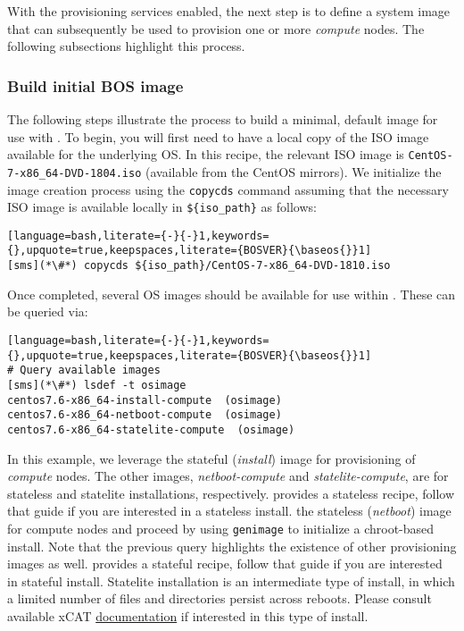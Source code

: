 
With the provisioning services enabled, the next step is to define
a system image that can subsequently be
used to provision one or more {\em compute} nodes. The following subsections highlight this process.

\subsubsection{Build initial BOS image} \label{sec:assemble_bos}
The following steps illustrate the process to build a minimal, default image for use with \xCAT{}. To begin, you will
first need to have a local copy of the ISO image available for the underlying OS. In this recipe, the relevant ISO image
is \texttt{CentOS-7-x86\_64-DVD-1804.iso} (available from the CentOS mirrors). We initialize the image
creation process using the \texttt{copycds} command assuming that the necessary ISO image is available locally in 
\texttt{\$\{iso\_path\}} as follows:

\begin{lstlisting}[language=bash,literate={-}{-}1,keywords={},upquote=true,keepspaces,literate={BOSVER}{\baseos{}}1]
[sms](*\#*) copycds ${iso_path}/CentOS-7-x86_64-DVD-1810.iso
\end{lstlisting}

\noindent Once completed, several OS images should be available for use within \xCAT{}. These can be queried via:

\begin{lstlisting}[language=bash,literate={-}{-}1,keywords={},upquote=true,keepspaces,literate={BOSVER}{\baseos{}}1]
# Query available images
[sms](*\#*) lsdef -t osimage
centos7.6-x86_64-install-compute  (osimage)
centos7.6-x86_64-netboot-compute  (osimage)
centos7.6-x86_64-statelite-compute  (osimage)
\end{lstlisting}

In this example, we leverage
the stateful ({\em install}) image for provisioning of {\em
compute} nodes.  The other images, {\em
netboot-compute} and {\em statelite-compute}, are for stateless and statelite
installations, respectively. \OHPC{} provides a stateless \xCAT{} recipe,
follow that guide if you are interested in a stateless install.
\else
the stateless ({\em netboot}) image for compute nodes and proceed by using
\texttt{genimage} to initialize a chroot-based install. Note that the previous query highlights the existence of other
provisioning images as well. \OHPC{} provides a stateful \xCAT{} recipe, 
follow that guide if you are interested in  stateful install.
\fi
Statelite installation is an intermediate type of install, in which a limited
number of files and directories persist across reboots.  Please consult
available xCAT \href{https://xcat-docs.readthedocs.io/en/stable/}{\color{blue}
documentation} if interested in this type of install.
